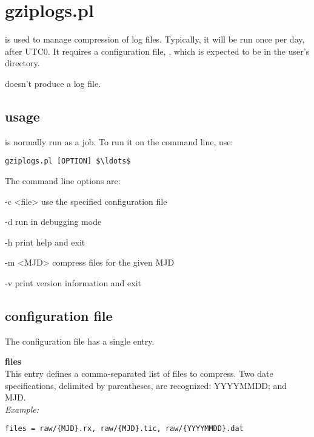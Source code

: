 \section{gziplogs.pl \label{s:gziplogs}}

 is used to manage compression of log files. 
Typically, it will be run once per day, after UTC0. It requires 
a configuration file, , which is expected to be
in the user's  directory. 

 doesn't produce a log file.

\subsection{usage}

 is normally run as a  job. To run it on the command line, use:
\begin{lstlisting}[mathescape=true]
gziplogs.pl [OPTION] $\ldots$
\end{lstlisting}
The command line options are:
\begin{description*}
	\item[-c \textless file\textgreater] use the specified configuration file
	\item[-d]	run in debugging mode
	\item[-h]	print help and exit
	\item[-m \textless MJD\textgreater] compress files for the given MJD
	\item[-v]	print version information and exit
\end{description*}

\subsection{configuration file}

The configuration file has a single entry.

{\bfseries files}\\
This entry defines a comma-separated list of files to compress. Two date specifications, 
delimited by parentheses, are recognized: YYYYMMDD; and MJD.\\
\textit{Example:}
\begin{lstlisting}
files = raw/{MJD}.rx, raw/{MJD}.tic, raw/{YYYYMMDD}.dat
\end{lstlisting}



